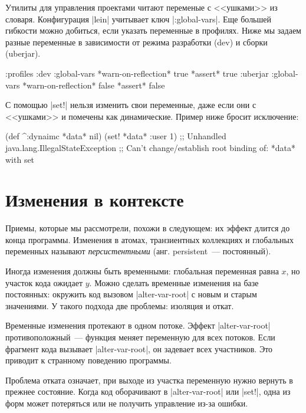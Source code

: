 Утилиты для управления проектами читают переменые с <<ушками>> из
словаря. Конфигурация \spverb|lein| учитывает ключ \spverb|:global-vars|. Еще
большей гибкости можно добиться, если указать переменные в профилях. Ниже мы
задаем разные переменные в зависимости от режима разработки (dev) и сборки
(uberjar).

\begin{english}
  \begin{clojure}
{:profiles
 :dev {:global-vars {*warn-on-reflection* true
                     *assert* true}}
 :uberjar {:global-vars {*warn-on-reflection* false
                         *assert* false}}}
  \end{clojure}
\end{english}

С помощью \spverb|set!| нельзя изменить свои переменные, даже если они с
<<ушками>> и помечены как динамические. Пример ниже бросит исключение:

\begin{english}
  \begin{clojure}
(def ^:dynaimc *data* nil)
(set! *data* {:user 1})
;; Unhandled java.lang.IllegalStateException
;; Can't change/establish root binding of: *data* with set
  \end{clojure}
\end{english}

\section{Изменения в контексте}

Приемы, которые мы рассмотрели, похожи в следующем: их эффект длится до конца
программы. Изменения в атомах, транзиентных коллекциях и глобальных переменных
называют \emph{персистентными} (анг. persistent~--- постоянный).

Иногда изменения должны быть временными: глобальная переменная равна $x$, но
участок кода ожидает $y$. Можно сделать временные изменения на базе постоянных:
окружить код вызовом \spverb|alter-var-root| с новым и старым значениями. У
такого подхода две проблемы: изоляция и откат.

Временные изменения протекают в одном потоке. Эффект \spverb|alter-var-root|
противоположный~--- функция меняет переменную для всех потоков. Если фрагмент
кода вызывает \spverb|alter-var-root|, он задевает всех участников. Это приводит
к странному поведению программы.

Проблема отката означает, при выходе из участка переменную нужно вернуть в
прежнее состояние. Когда код оборачивают в \spverb|alter-var-root| или
\spverb|set!|, одна из форм может потеряться или не получить управление из-за
ошибки.

